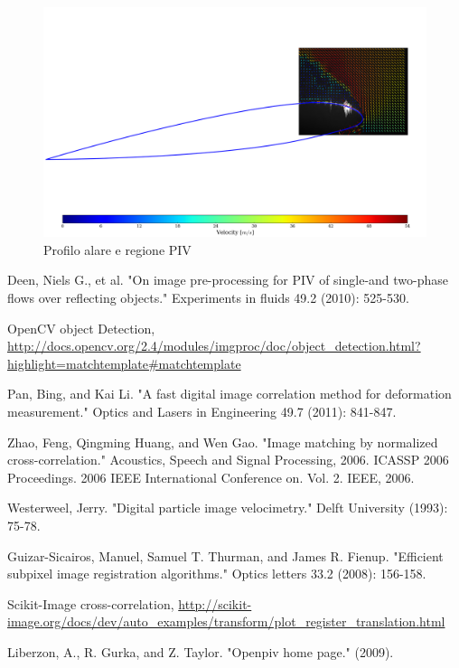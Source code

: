 \documentclass[a4paper]{article}
\begin{document}
\begin{figure}[ht]
	\centering
	\includegraphics[width=1\textwidth]{images/All_norm_CM_32_orig.png}
	\caption{Profilo alare e regione PIV}
	\label{fig:airfoil}
\end{figure}

\newpage

\begin{thebibliography}{9}
Deen, Niels G., et al. "On image pre-processing for PIV of single-and two-phase flows over reflecting objects." Experiments in fluids 49.2 (2010): 525-530.

OpenCV object Detection, \url{http://docs.opencv.org/2.4/modules/imgproc/doc/object_detection.html?highlight=matchtemplate#matchtemplate}

Pan, Bing, and Kai Li. "A fast digital image correlation method for deformation measurement." Optics and Lasers in Engineering 49.7 (2011): 841-847.

Zhao, Feng, Qingming Huang, and Wen Gao. "Image matching by normalized cross-correlation." Acoustics, Speech and Signal Processing, 2006. ICASSP 2006 Proceedings. 2006 IEEE International Conference on. Vol. 2. IEEE, 2006.

Westerweel, Jerry. "Digital particle image velocimetry." Delft University (1993): 75-78.

Guizar-Sicairos, Manuel, Samuel T. Thurman, and James R. Fienup. "Efficient subpixel image registration algorithms." Optics letters 33.2 (2008): 156-158.


Scikit-Image cross-correlation,
\url{http://scikit-image.org/docs/dev/auto_examples/transform/plot_register_translation.html}

Liberzon, A., R. Gurka, and Z. Taylor. "Openpiv home page." (2009).

\end{thebibliography}
\end{document}
